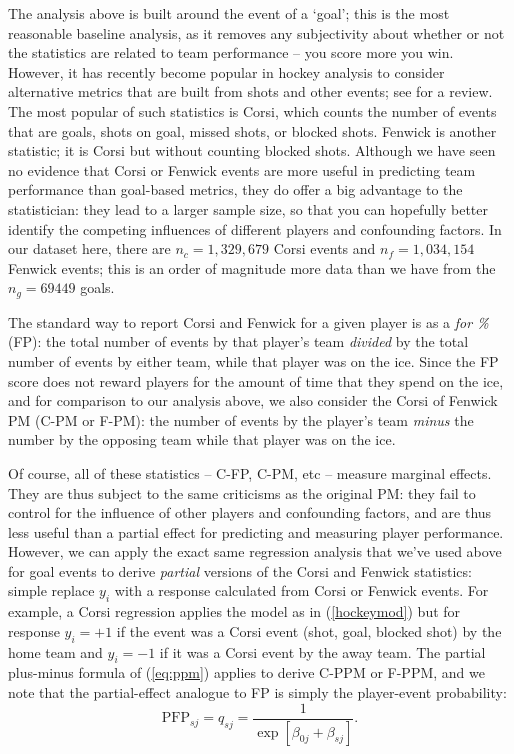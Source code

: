 The analysis above is built around the event of a `goal'; this is the most
reasonable baseline analysis, as it removes any subjectivity about whether or
not the statistics are related to team performance -- you score more you win.
However, it has recently become popular in hockey analysis to consider
alternative metrics that are built from shots and other events; see
\cite{vol10} for a review. The most popular of such statistics is Corsi, which
counts the number of events that are goals, shots on goal, missed shots, or
blocked shots.  Fenwick is another statistic; it is Corsi but without counting
blocked shots.  Although we have seen no evidence that Corsi or Fenwick events
are more useful in predicting team performance than goal-based metrics, they
do offer a big advantage to the statistician: they lead to a larger sample
size, so that you can hopefully better identify the competing influences of
different players and confounding factors. In our dataset here, there are
$n_{c}=1,329,679$ Corsi events and $n_{f}=1,034,154$ Fenwick events; this is
an order of magnitude more data than we have from the $n_g=69449$ goals.

The standard way to report Corsi and Fenwick for a given player is as a
\textit{for \%} (FP): the total number of events by that player's team
\textit{divided} by the total number of events by either team, while that
player was on the ice.  Since the FP score does not reward players for the
amount of time that they spend on the ice, and for comparison to our analysis
above, we also consider the Corsi of Fenwick PM (C-PM or F-PM): the number
of events by the player's team \textit{minus} the number by the opposing team
while that player was on the ice.  

Of course, all of these statistics -- C-FP, C-PM, etc -- measure marginal
effects.  They are thus subject to the same criticisms as the original PM:
they fail to control for the influence of other players and confounding
factors, and are thus less useful than a partial effect for predicting and
measuring player performance.  However, we can apply the exact same regression
analysis that we've used above for goal events to derive \textit{partial}
versions of the Corsi and Fenwick statistics: simple replace $y_i$ with a
response calculated from Corsi or Fenwick events.  For example, a Corsi
regression applies the model as in (\ref{hockeymod}) but for response $y_i=+1$
if the event was a Corsi event (shot, goal, blocked shot) by the home team and
$y_i=-1$ if it was a Corsi event by the away team. The partial plus-minus
formula of (\ref{eq:ppm}) applies to derive C-PPM or F-PPM, and we note that
the partial-effect analogue to FP is simply the player-event probability:
\begin{equation}
\text{PFP}_{sj} = q_{sj} = \frac{1}{\exp[\beta_{0j} + \beta_{sj}]}.
\end{equation}


